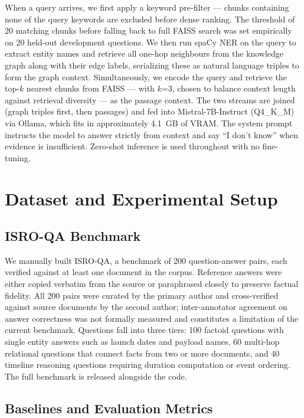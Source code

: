 \documentclass[conference]{IEEEtran}
\begin{document}
When a query arrives, we first apply a keyword pre-filter — chunks containing none of the query keywords are excluded before dense ranking. The threshold of 20 matching chunks before falling back to full FAISS search was set empirically on 20 held-out development questions. We then run spaCy NER on the query to extract entity names and retrieve all one-hop neighbours from the knowledge graph along with their edge labels, serializing these as natural language triples to form the graph context. Simultaneously, we encode the query and retrieve the top-$k$ nearest chunks from FAISS — with $k$=3, chosen to balance context length against retrieval diversity — as the passage context. The two streams are joined (graph triples first, then passages) and fed into Mistral-7B-Instruct (Q4\_K\_M) via Ollama, which fits in approximately 4.1~GB of VRAM. The system prompt instructs the model to answer strictly from context and say ``I don't know'' when evidence is insufficient. Zero-shot inference is used throughout with no fine-tuning.

\section{Dataset and Experimental Setup}
\label{sec:experiments}

\subsection{ISRO-QA Benchmark}

We manually built ISRO-QA, a benchmark of 200 question-answer pairs, each verified against at least one document in the corpus. Reference answers were either copied verbatim from the source or paraphrased closely to preserve factual fidelity. All 200 pairs were curated by the primary author and cross-verified against source documents by the second author; inter-annotator agreement on answer correctness was not formally measured and constitutes a limitation of the current benchmark. Questions fall into three tiers: 100 factoid questions with single entity answers such as launch dates and payload names, 60 multi-hop relational questions that connect facts from two or more documents, and 40 timeline reasoning questions requiring duration computation or event ordering. The full benchmark is released alongside the code.

\subsection{Baselines and Evaluation Metrics}
\end{document}
